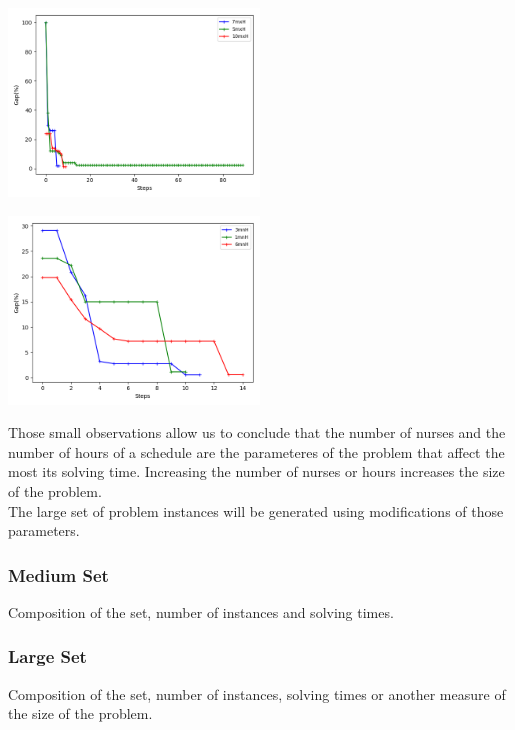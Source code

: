 \begin{center}
\includegraphics[width=0.5\textwidth]{./img/instances_maxhours_ilp_evol.png}
\end{center} 

\begin{center}
\includegraphics[width=0.5\textwidth]{./img/instances_minhours_ilp_evol.png}
\end{center}


Those small observations allow us to conclude that the number of nurses and the number of hours of a schedule are the parameteres of the problem that affect the most its solving time. Increasing the number of nurses or hours increases the size of the problem.\\
The large set of problem instances will be generated using modifications of those parameters.


\subsubsection{Medium Set}

Composition of the set, number of instances and solving times.

\subsubsection{Large Set}

Composition of the set, number of instances, solving times or another measure of the size of the problem.


\pagebreak